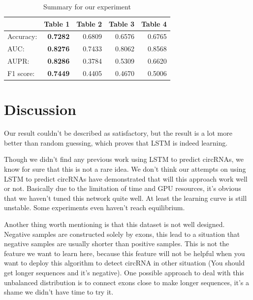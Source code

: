 \documentclass[10pt,a4paper]{article}
\begin{document}
\begin{spacing}{1.5}
		\begin{table}[H]
			\centering
			\caption{Summary for our experiment}
			\begin{tabular}{l|r|r|r|r}
				& \multicolumn{1}{l}{Table 1} & \multicolumn{1}{l}{Table 2} & \multicolumn{1}{l}{Table 3} & \multicolumn{1}{l}{Table 4} \\ \hline \hline
				Accuracy: & \textbf{0.7282}  & 0.6809  & 0.6576  & 0.6765  \\
				AUC:  & \textbf{0.8276}  & 0.7433  & 0.8062  & 0.8568  \\
				AUPR: & \textbf{0.8286}  & 0.3784  & 0.5309  & 0.6620  \\
				F1 score: & \textbf{0.7449}  & 0.4405  & 0.4670  & 0.5006  \\
			\end{tabular}%
			\label{tab:addlabel}%
		\end{table}%
		
		\section{Discussion}
		
		Our result couldn't be described as satisfactory, but the result is a lot more better than random guessing, which proves that LSTM is indeed learning.
		
		Though we didn't find any previous work using LSTM to predict circRNAs, we know for sure that this is not a rare idea. We don't think our attempts on using LSTM to predict circRNAs have demonstrated that will this approach work well or not. Basically due to the limitation of time and GPU resources, it's obvious that we haven't tuned this network quite well. At least the learning curve is still unstable. Some experiments even haven't reach equilibrium.
		
		Another thing worth mentioning is that this dataset is not well designed. Negative samples are constructed solely by exons, this lead to a situation that negative samples are usually shorter than positive samples. This is not the feature we want to learn here, because this feature will not be helpful when you want to deploy this algorithm to detect circRNA in other situation (You should get longer sequences and it's negative). One possible approach to deal with this unbalanced distribution is to connect exons close to make longer sequences, it's a shame we didn't have time to try it.
		

\end{spacing}
\end{document}
